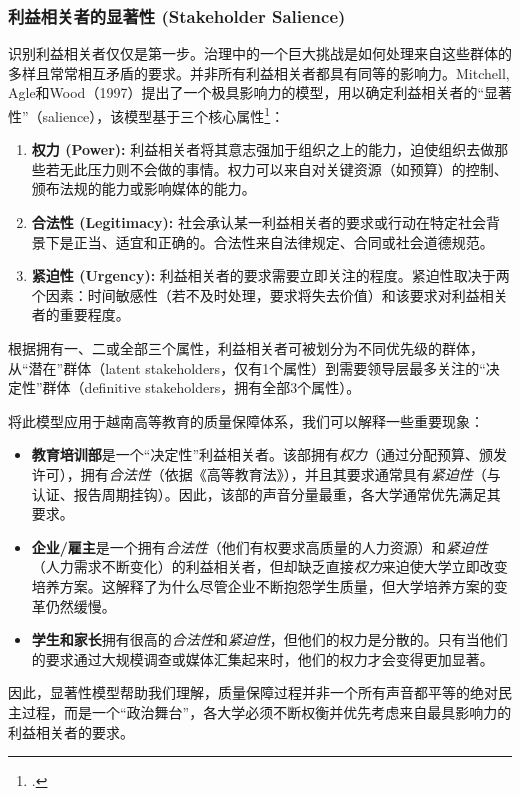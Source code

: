 \subsubsection{利益相关者的显著性 (Stakeholder Salience)}

识别利益相关者仅仅是第一步。治理中的一个巨大挑战是如何处理来自这些群体的多样且常常相互矛盾的要求。并非所有利益相关者都具有同等的影响力。Mitchell, Agle和Wood（1997）提出了一个极具影响力的模型，用以确定利益相关者的“显著性”（salience），该模型基于三个核心属性\footcite{Mitchell1997}：

\begin{enumerate}
    \item \textbf{权力 (Power):} 利益相关者将其意志强加于组织之上的能力，迫使组织去做那些若无此压力则不会做的事情。权力可以来自对关键资源（如预算）的控制、颁布法规的能力或影响媒体的能力。
    \item \textbf{合法性 (Legitimacy):} 社会承认某一利益相关者的要求或行动在特定社会背景下是正当、适宜和正确的。合法性来自法律规定、合同或社会道德规范。
    \item \textbf{紧迫性 (Urgency):} 利益相关者的要求需要立即关注的程度。紧迫性取决于两个因素：时间敏感性（若不及时处理，要求将失去价值）和该要求对利益相关者的重要程度。
\end{enumerate}

根据拥有一、二或全部三个属性，利益相关者可被划分为不同优先级的群体，从“潜在”群体（latent stakeholders，仅有1个属性）到需要领导层最多关注的“决定性”群体（definitive stakeholders，拥有全部3个属性）。

将此模型应用于越南高等教育的质量保障体系，我们可以解释一些重要现象：
\begin{itemize}
    \item \textbf{教育培训部}是一个“决定性”利益相关者。该部拥有\textit{权力}（通过分配预算、颁发许可），拥有\textit{合法性}（依据《高等教育法》），并且其要求通常具有\textit{紧迫性}（与认证、报告周期挂钩）。因此，该部的声音分量最重，各大学通常优先满足其要求。
    \item \textbf{企业/雇主}是一个拥有\textit{合法性}（他们有权要求高质量的人力资源）和\textit{紧迫性}（人力需求不断变化）的利益相关者，但却缺乏直接\textit{权力}来迫使大学立即改变培养方案。这解释了为什么尽管企业不断抱怨学生质量，但大学培养方案的变革仍然缓慢。
    \item \textbf{学生和家长}拥有很高的\textit{合法性}和\textit{紧迫性}，但他们的权力是分散的。只有当他们的要求通过大规模调查或媒体汇集起来时，他们的权力才会变得更加显著。
\end{itemize}
因此，显著性模型帮助我们理解，质量保障过程并非一个所有声音都平等的绝对民主过程，而是一个“政治舞台”，各大学必须不断权衡并优先考虑来自最具影响力的利益相关者的要求。

